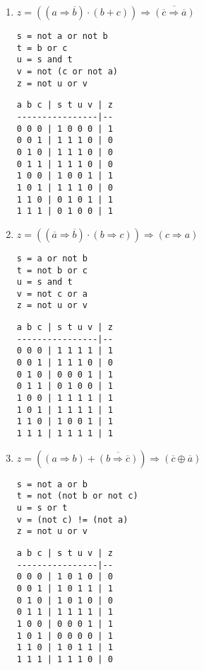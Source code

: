 \documentclass[11pt,a4paper]{article}
\begin{document}
\begin{enumerate}
\item $z = ((a \Rightarrow \overline{b}) \cdot (b + c)) \Rightarrow \overline{(\overline{c} \Rightarrow \overline{a})}$
\hfill
\begin{minipage}[t]{4cm}\footnotesize
\begin{Verbatim}
s = not a or not b
t = b or c
u = s and t
v = not (c or not a)
z = not u or v
\end{Verbatim}
\end{minipage}
\hspace*{3mm}
\begin{minipage}[t]{3.5cm}\footnotesize
\begin{Verbatim}
a b c | s t u v | z
----------------|--
0 0 0 | 1 0 0 0 | 1
0 0 1 | 1 1 1 0 | 0
0 1 0 | 1 1 1 0 | 0
0 1 1 | 1 1 1 0 | 0
1 0 0 | 1 0 0 1 | 1
1 0 1 | 1 1 1 0 | 0
1 1 0 | 0 1 0 1 | 1
1 1 1 | 0 1 0 0 | 1
\end{Verbatim}
\end{minipage}
\vspace*{3mm}

\item $z = ((\overline{a} \Rightarrow \overline{b}) \cdot (b \Rightarrow c)) \Rightarrow ({c} \Rightarrow {a})$
\hfill
\begin{minipage}[t]{4cm}\footnotesize
\begin{Verbatim}
s = a or not b
t = not b or c
u = s and t
v = not c or a
z = not u or v
\end{Verbatim}
\end{minipage}
\hspace*{3mm}
\begin{minipage}[t]{3.5cm}\footnotesize
\begin{Verbatim}
a b c | s t u v | z
----------------|--
0 0 0 | 1 1 1 1 | 1
0 0 1 | 1 1 1 0 | 0
0 1 0 | 0 0 0 1 | 1
0 1 1 | 0 1 0 0 | 1
1 0 0 | 1 1 1 1 | 1
1 0 1 | 1 1 1 1 | 1
1 1 0 | 1 0 0 1 | 1
1 1 1 | 1 1 1 1 | 1
\end{Verbatim}
\end{minipage}
\vspace*{3mm}

\item $z = ({(a \Rightarrow b)} + \overline{(b \Rightarrow \overline{c})}) \Rightarrow (\overline{c} \oplus \overline{a})$ 
\hfill
\begin{minipage}[t]{4cm}\footnotesize
\begin{Verbatim}
s = not a or b
t = not (not b or not c)
u = s or t
v = (not c) != (not a)
z = not u or v
\end{Verbatim}
\end{minipage}
\hspace*{3mm}
\begin{minipage}[t]{3.5cm}\footnotesize
\begin{Verbatim}
a b c | s t u v | z
----------------|--
0 0 0 | 1 0 1 0 | 0
0 0 1 | 1 0 1 1 | 1
0 1 0 | 1 0 1 0 | 0
0 1 1 | 1 1 1 1 | 1
1 0 0 | 0 0 0 1 | 1
1 0 1 | 0 0 0 0 | 1
1 1 0 | 1 0 1 1 | 1
1 1 1 | 1 1 1 0 | 0
\end{Verbatim}
\end{minipage}
\vspace*{3mm}


\end{enumerate}
\end{document}
